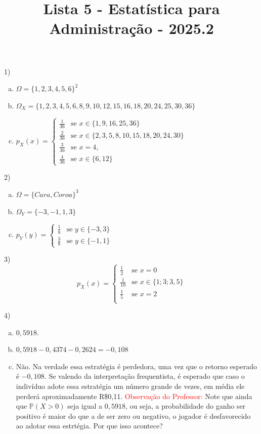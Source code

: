 \documentclass[12pt]{article}
\title{Lista 5 - Estatística para Administração - 2025.2}
\begin{document}
\date{}
\maketitle

1) 

\begin{enumerate}[a)]
    \item $\Omega = \{1,2,3,4,5,6\}^2$
    \item $\Omega_X = \{1,2,3,4,5,6,8,9,10,12,15,16,18,20,24,25,30,36\}$
    \item $p_X(x) = \begin{cases}
        \frac{1}{36} & \text{se } x \in \{1,9, 16, 25, 36\}\\
        \frac{2}{36} & \text{se } x \in \{2,3,5,8,10,15,18,20,24,30\}\\
        \frac{3}{36} & \text{se } x =4, \\
        \frac{4}{36} & \text{se } x \in \{6,12\}
    \end{cases}$
\end{enumerate}

2)

\begin{enumerate}[a)]
    \item $\Omega = \{Cara, Coroa\}^3$
    \item $\Omega_Y = \{-3, -1, 1, 3\}$
    \item $p_Y(y) = \begin{cases}
    \frac{1}{8} &\text{se } y \in \{-3, 3\}\\
    \frac{3}{8} &\text{se } y \in \{-1, 1\}
    \end{cases}$
\end{enumerate}
    

3) 
$$p_X(x) = \begin{cases}
    \frac{1}{2} &\text{se } x = 0\\
    \frac{1}{10}  &\text{se } x \in \{1; 3; 3,5\}\\
    \frac{1}{5}  &\text{se } x = 2\\
\end{cases}$$

4) 

\begin{enumerate}[(a)]
    \item  $0,5918$.
    \item $0,5918 -0,4374  -0,2624 = -0,108$
    \item Não. Na verdade essa estratégia é perdedora, uma vez que o retorno esperado é $-0,108$. Se valendo da interpretação frequentista,
    é esperado que caso o indivíduo adote essa estratégia um número grande de vezes, em média ele perderá aproximadamente R\$0{,}11.
    \textcolor{red}{Observação do Professor:} Note que ainda que $\mathds{P}(X>0)$ seja igual a $0,5918$, ou seja, a probabilidade do ganho ser positivo é maior do que a 
    de ser zero ou negativo, o jogador é desfavorecido ao adotar essa estrtégia. Por que isso acontece?
\end{enumerate}
 
\end{document}
